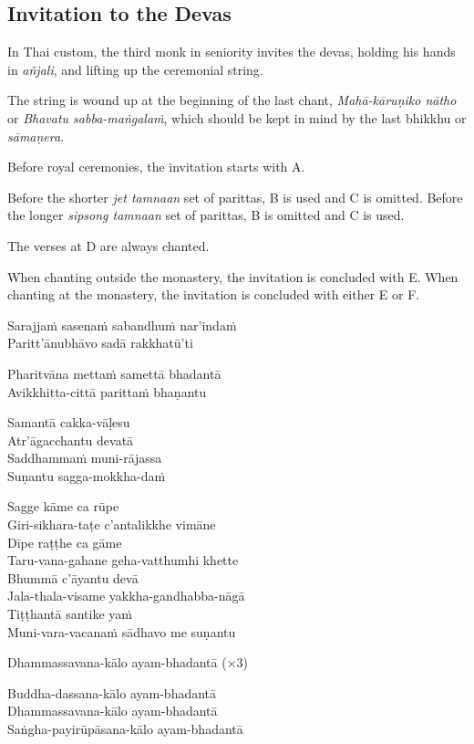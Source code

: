 \subsection{Invitation to the Devas}
\label{paritta-devas}


\enlargethispage{\baselineskip}

In Thai custom, the third monk in seniority invites the devas, holding his
hands in \emph{añjali}, and lifting up the ceremonial string.

The string is wound up at the beginning of the last chant, \emph{Mahā-kāruṇiko
  nātho} or \emph{Bhavatu sabba-maṅgalaṁ}, which should be kept in mind by the
last bhikkhu or \emph{sāmaṇera}.

Before royal ceremonies, the invitation starts with A.

Before the shorter \emph{jet tamnaan} set of parittas, B is used and C is
omitted. Before the longer \emph{sipsong tamnaan} set of parittas, B is
omitted and C is used.

The verses at D are always chanted.

When chanting outside the monastery, the invitation is concluded with E. When
chanting at the monastery, the invitation is concluded with either E or F.

\clearpage

\begin{paritta}


%
Sarajjaṁ sasenaṁ sabandhuṁ nar'indaṁ\\
Paritt'ānubhāvo sadā rakkhatū'ti

%
Pharitvāna mettaṁ samettā bhadantā\\
Avikkhitta-cittā parittaṁ bhaṇantu

%
Samantā cakka-vāḷesu\\
Atr'āgacchantu devatā\\
Saddhammaṁ muni-rājassa\\
Suṇantu sagga-mokkha-daṁ

%
Sagge kāme ca rūpe\\
Giri-sikhara-taṭe c'antalikkhe vimāne\\
Dīpe raṭṭhe ca gāme\\
Taru-vana-gahane geha-vatthumhi khette\\
Bhummā c'āyantu devā\\
Jala-thala-visame yakkha-gandhabba-nāgā\\
Tiṭṭhantā santike yaṁ\\
Muni-vara-vacanaṁ sādhavo me suṇantu

%
Dhammassavana-kālo ayam-bhadantā (×3)


%
Buddha-dassana-kālo ayam-bhadantā\\
Dhammassavana-kālo ayam-bhadantā\\
Saṅgha-payirūpāsana-kālo ayam-bhadantā
\end{paritta}


